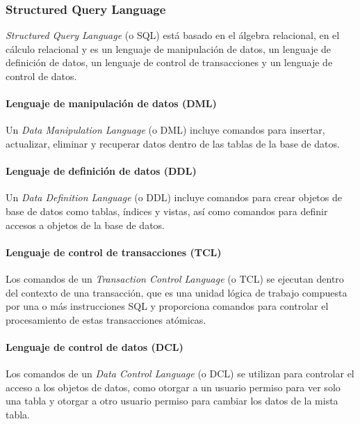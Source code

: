 \subsubsection{Structured Query Language}
\textit{Structured Query Language} (o SQL) está basado en el álgebra relacional, en el cálculo relacional y es un lenguaje de manipulación de datos, un lenguaje de definición de datos, un lenguaje de control de transacciones y un lenguaje de control de datos.

\paragraph*{Lenguaje de manipulación de datos (DML)}
Un \textit{Data Manipulation Language} (o DML) incluye comandos para insertar, actualizar, eliminar y recuperar datos dentro de las tablas de la base de datos. 

\paragraph*{Lenguaje de definición de datos (DDL)}
 Un \textit{Data Definition Language} (o DDL) incluye comandos para crear objetos de base de datos como tablas, índices y vistas, así como comandos para definir accesos a objetos de la base de datos. 

\paragraph*{Lenguaje de control de transacciones (TCL)}
Los comandos de un \textit{Transaction Control Language} (o TCL) se ejecutan dentro del contexto de una transacción, que es una unidad lógica de trabajo compuesta por una o más instrucciones SQL y proporciona comandos para controlar el procesamiento de estas transacciones atómicas.

\paragraph*{Lenguaje de control de datos (DCL)}
Los comandos de un \textit{Data Control Language} (o DCL) se utilizan para controlar el acceso a los objetos de datos, como otorgar a un usuario permiso para ver solo una tabla y otorgar a otro usuario permiso para cambiar los datos de la mista tabla.
